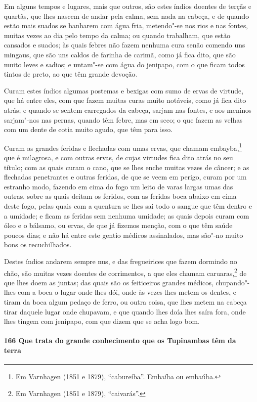 Em alguns tempos e lugares, mais que outros, são estes índios doentes de terçãs e quartãs,
que lhes nascem de andar pela calma, sem nada na cabeça, e de quando estão mais suados se
banharem com água fria, metendo"-se nos rios e nas fontes, muitas vezes ao dia pelo tempo
da calma; ou quando trabalham, que estão cansados e suados; às quais febres não fazem
nenhuma cura senão comendo uns mingaus, que são uns caldos de farinha de carimã, como já
fica dito, que são muito leves e sadios; e untam"-se com água do jenipapo, com o que ficam
todos tintos de preto, ao que têm grande devoção.

Curam estes índios algumas postemas e bexigas com sumo de ervas de virtude, que há entre
eles, com que fazem muitas curas muito notáveis, como já fica dito atrás; e quando se
sentem carregados da cabeça, sarjam nas fontes, e aos meninos sarjam"-nos nas pernas, quando
têm febre, mas em seco; o que fazem as velhas com um dente de cotia muito agudo, que têm
para isso.

Curam as grandes feridas e flechadas com umas ervas, que chamam embayba,\footnote{ Em
Varnhagen (1851 e 1879), ``cabureíba''. Embaíba ou embaúba.} que é milagrosa, e com
outras ervas, de cujas virtudes fica dito atrás no seu título; com as quais curam o cano,
que se lhes enche muitas vezes de câncer; e as flechadas penetrantes e outras feridas, de
que se veem em perigo, curam por um estranho modo, fazendo em cima do fogo um leito de
varas largas umas das outras, sobre as quais deitam os feridos, com as feridas boca abaixo
em cima deste fogo, pelas quais com a quentura se lhes sai todo o sangue que têm dentro e
a umidade; e ficam as feridas sem nenhuma umidade; as quais depois curam com óleo e o
bálsamo, ou ervas, de que já fizemos menção, com o que têm saúde poucos dias; e não há
entre este gentio médicos assinalados, mas são"-no muito bons os recuchilhados.


Destes índios andarem sempre nus, e das fregueirices que fazem dormindo no chão, são
muitas vezes doentes de corrimentos, a que eles chamam caruaras,\footnote{ Em Varnhagen
(1851 e 1879), ``caivarás''.} de que lhes doem as juntas; das quais são os feiticeiros
grandes médicos, chupando"-lhes com a boca o lugar onde lhes dói, onde às vezes lhes metem
os dentes, e tiram da boca algum pedaço de ferro, ou outra coisa, que lhes metem na cabeça
tirar daquele lugar onde chupavam, e que quando lhes doía lhes saíra fora, onde lhes
tingem com jenipapo, com que dizem que se acha logo bom.

\paragraph{166 Que trata do grande conhecimento que os Tupinambas têm da terra}

